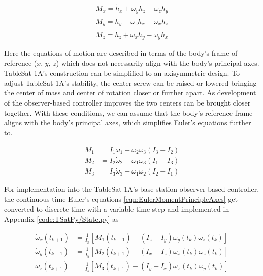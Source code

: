 \begin{subequations}
  \begin{align}
    M_x = \dot{h}_x + \omega_y h_z - \omega_z h_y \\
    M_y = \dot{h}_y + \omega_z h_x - \omega_x h_z \\
    M_z = \dot{h}_z + \omega_x h_y - \omega_y h_x
  \end{align}
  \label{eqn:EulerMoment}
\end{subequations}

Here the equations of motion are described in terms of the body's frame of reference ($x$, $y$, $z$) which does not necessarily align with the body's principal axes.  TableSat 1A's construction can be simplified to an axisymmetric design.  To adjust TableSat 1A's stability, the center screw can be raised or lowered bringing the center of mass and center of rotation closer or further apart.  As development of the observer-based controller improves the two centers can be brought closer together.  With these conditions, we can assume that the body's reference frame aligns with the body's principal axes, which simplifies Euler's equations further to.

\begin{subequations}
  \begin{align}
    M_1 & = I_1 \dot{\omega}_1 + \omega_2 \omega_3 (I_3 - I_2) \\
    M_2 & = I_2 \dot{\omega}_2 + \omega_1 \omega_3 (I_1 - I_3) \\
    M_3 & = I_3 \dot{\omega}_3 + \omega_1 \omega_2 (I_2 - I_1)
  \end{align}
  \label{eqn:EulerMomentPrincipleAxes}
\end{subequations}

For implementation into the TableSat 1A's base station observer based controller, the continuous time Euler's equations \ref{eqn:EulerMomentPrincipleAxes} get converted to discrete time with a variable time step and implemented in Appendix \ref{code:TSatPy/State.py} as

\begin{subequations}
  \begin{align}
    \dot{\omega}_{x}(t_{k+1}) & = \frac{1}{I_x} \left[ M_1(t_{k+1}) - (I_z - I_y) \omega_{y}(t_k) \omega_{z}(t_k) \right] \\
    \dot{\omega}_{y}(t_{k+1}) & = \frac{1}{I_y} \left[ M_2(t_{k+1}) - (I_x - I_z) \omega_{x}(t_k) \omega_{z}(t_k) \right] \\
    \dot{\omega}_{z}(t_{k+1}) & = \frac{1}{I_z} \left[ M_3(t_{k+1}) - (I_y - I_x) \omega_{x}(t_k) \omega_{y}(t_k) \right]
  \end{align}
  \label{eqn:DiscreteEulerMomentEquations}
\end{subequations}

